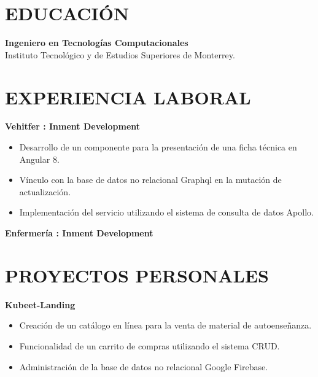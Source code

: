 \documentclass{res}
\begin{document}
\address{
}

\begin{resume}
    \vspace{-4mm}
    \separator

    \section{\large{EDUCACIÓN}} 

    \textbf{Ingeniero en Tecnologías Computacionales} 
     \\
    Instituto Tecnológico y de Estudios Superiores de Monterrey.
    
    \section{\large{EXPERIENCIA LABORAL}} 

    \textbf{Vehitfer : Inment Development} 
    \begin{itemize}
        \item Desarrollo de un componente para la presentación de una ficha técnica en Angular 8.
        \item Vínculo con la base de datos no relacional Graphql en la mutación de actualización.
        \item Implementación del servicio utilizando el sistema de consulta de datos Apollo.
    \end{itemize}

    \textbf{Enfermería : Inment Development} 

    \section{\large{PROYECTOS PERSONALES}} 

    \textbf{Kubeet-Landing} 
    \begin{itemize}
        \item Creación de un catálogo en línea para la venta de material de autoenseñanza.
        \item Funcionalidad de un carrito de compras utilizando el sistema CRUD.
        \item Administración de la base de datos no relacional Google Firebase.
    \end{itemize}


\end{resume}
\end{document}
